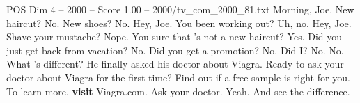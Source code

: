 \begin{textsample}{POS Dim 4 – 2000 – Score 1.00 – 2000/tv\_com\_2000\_81.txt}  \label{ex:f4_pos_076}
Morning, Joe.
New haircut?
No.
New shoes?
No.
Hey, Joe.
You been working out?
Uh, no.
Hey, Joe.
Shave your mustache?
Nope.
You sure that 's not a new haircut?
Yes.
Did you just get back from vacation?
No.
Did you get a promotion?
No.
Did I?
No.
No.
What 's different?
He finally asked his doctor about Viagra.
Ready to ask your doctor about Viagra for the first time?
Find out if a free sample is right for you.
To learn more, \textbf{visit} Viagra.com.
Ask your doctor.
Yeah.
And see the difference.

\end{textsample}
